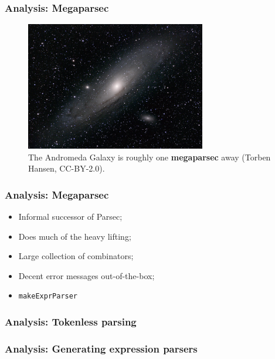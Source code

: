 \documentclass{beamer}
\begin{document}
\begin{frame}
  \frametitle{Analysis: Megaparsec}

  \begin{figure}
    \begin{center}
      \includegraphics[width=0.7\textwidth]{figures/andromeda.jpg}
      \captionsetup{labelformat=empty}
      \caption{The Andromeda Galaxy is roughly one \textbf{megaparsec} away (Torben Hansen, CC-BY-2.0).}
    \end{center}
  \end{figure}
\end{frame}

\begin{frame}
  \frametitle{Analysis: Megaparsec}

  \begin{itemize}[<+->]
    \item Informal successor of Parsec;
    \item Does much of the heavy lifting;
    \item Large collection of combinators;
    \item Decent error messages out-of-the-box;
    \item \texttt{makeExprParser} 
  \end{itemize}
\end{frame}

\begin{frame}
  \frametitle{Analysis: Tokenless parsing}

\end{frame}

\begin{frame}
  \frametitle{Analysis: Generating expression parsers}

\end{frame}
\end{document}
